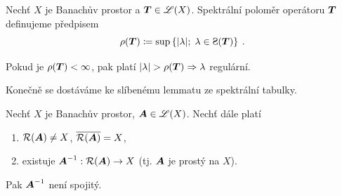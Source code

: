 \begin{definition}
Nechť $X$ je Banachův prostor a $\boldsymbol{T} \in \mathscr{L}(X)$. Spektrální poloměr operátoru $\boldsymbol{T}$ definujeme předpisem $$ \rho(\map T)\coloneqq \sup \left \lbrace |\lambda|;\; \lambda\in\Sp(\map T) \right \rbrace \:.$$
\end{definition}

 Pokud je $\rho(\boldsymbol{T}) <\infty$, pak platí $|\lambda|>\rho(\map T)\Rightarrow \lambda$ regulární.

Konečně se dostáváme ke slíbenému lemmatu ze spektrální tabulky.
\begin{lemma}
Nechť $X$ je Banachův prostor, $\boldsymbol{A} \in \mathscr{L} (X)$. Nechť dále platí \begin{enumerate}
    \item $\mathcal{R}(\boldsymbol{A})\neq X$, $\overline{\mathcal{R}(\boldsymbol{A})}=X$,
    \item existuje $\boldsymbol{A}^{-1}: \mathcal{R}(\boldsymbol{A}) \to X$ (tj. $\boldsymbol{A}$ je prostý na $X$). %
    \label{lemma1}
\end{enumerate}
Pak $\boldsymbol{A}^{-1}$ není spojitý.
\end{lemma}

